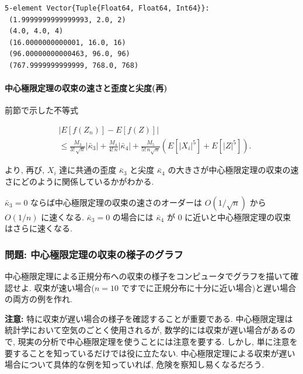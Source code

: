 \documentclass[
  letterpaper,
  DIV=11,
  numbers=noendperiod]{scrartcl}
\let\oldparagraph\paragraph
\renewcommand{\paragraph}[1]{\oldparagraph{#1}\mbox{}}
\begin{document}
\begin{verbatim}
5-element Vector{Tuple{Float64, Float64, Int64}}:
 (1.9999999999999993, 2.0, 2)
 (4.0, 4.0, 4)
 (16.0000000000001, 16.0, 16)
 (96.00000000000463, 96.0, 96)
 (767.9999999999999, 768.0, 768)
\end{verbatim}

\hypertarget{ux4e2dux5fc3ux6975ux9650ux5b9aux7406ux306eux53ceux675fux306eux901fux3055ux3068ux6b6aux5ea6ux3068ux5c16ux5ea6ux518d}{%
\paragraph{中心極限定理の収束の速さと歪度と尖度(再)}\label{ux4e2dux5fc3ux6975ux9650ux5b9aux7406ux306eux53ceux675fux306eux901fux3055ux3068ux6b6aux5ea6ux3068ux5c16ux5ea6ux518d}}

前節で示した不等式

\[
\begin{aligned}
&
|E[f(Z_n)] - E[f(Z)]|
\\ &\le
\frac{M_3}{3!\,\sqrt{n}}|\bar\kappa_3| +
\frac{M_4}{4!\,n}|\bar\kappa_4| +
\frac{M_5}{5!\,n\sqrt{n}}(E[|X_i|^5] + E[|Z|^5]).
\end{aligned}
\]

より, 再び, \(X_i\) 達に共通の歪度 \(\bar\kappa_3\) と尖度
\(\bar\kappa_4\)
の大きさが中心極限定理の収束の速さにどのように関係しているかがわかる.

\(\bar\kappa_3 = 0\) ならば中心極限定理の収束の速さのオーダーは
\(O(1/\sqrt{n})\) から \(O(1/n)\) に速くなる. \(\bar\kappa_3 = 0\)
の場合には \(\bar\kappa_4\) が \(0\)
に近いと中心極限定理の収束はさらに速くなる.

\hypertarget{ux554fux984c-ux4e2dux5fc3ux6975ux9650ux5b9aux7406ux306eux53ceux675fux306eux69d8ux5b50ux306eux30b0ux30e9ux30d5}{%
\subsubsection{問題:
中心極限定理の収束の様子のグラフ}\label{ux554fux984c-ux4e2dux5fc3ux6975ux9650ux5b9aux7406ux306eux53ceux675fux306eux69d8ux5b50ux306eux30b0ux30e9ux30d5}}

中心極限定理による正規分布への収束の様子をコンピュータでグラフを描いて確認せよ.
収束が速い場合(\(n=10\)
ですでに正規分布に十分に近い場合)と遅い場合の両方の例を作れ.

\textbf{注意:} 特に収束が遅い場合の様子を確認することが重要である.
中心極限定理は統計学において空気のごとく使用されるが,
数学的には収束が遅い場合があるので,
現実の分析で中心極限定理を使うことには注意を要する. しかし,
単に注意を要することを知っているだけでは役に立たない.
中心極限定理による収束が遅い場合について具体的な例を知っていれば,
危険を察知し易くなるだろう.
\end{document}
